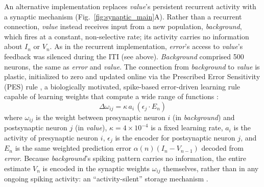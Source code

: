 \begin{ms}

An alternative implementation replaces \textit{value}'s persistent recurrent activity with a synaptic mechanism (Fig.~\ref{fig:synaptic_main}A). Rather than a recurrent connection, \textit{value} instead receives input from a new population, \textit{background}, which fires at a constant, non-selective rate; its activity carries no information about $I_n$ or $V_n$. As in the recurrent implementation, \textit{error}'s access to \textit{value}'s feedback was silenced during the ITI (see above). \textit{Background} comprised 500 neurons, the same as \textit{error} and \textit{value}. The connection from \textit{background} to \textit{value} is plastic, initialized to zero and updated online via the Prescribed Error Sensitivity (PES) rule \citep{macneil2011fine}, a biologically motivated, spike-based error-driven learning rule capable of learning weights that compute a wide range of functions \citep{voelker2015solution}:
\[
	\Delta\omega_{ij} = \kappa\, a_i\, (\epsilon_j \cdot E_n)
\]
where $\omega_{ij}$ is the weight between presynaptic neuron $i$ (in \textit{background}) and postsynaptic neuron $j$ (in \textit{value}), $\kappa=4\times10^{-4}$ is a fixed learning rate, $a_i$ is the activity of presynaptic neuron $i$, $\epsilon_j$ is the encoder for postsynaptic neuron $j$, and $E_n$ is the same weighted prediction error $\alpha(n)(I_n-V_{n-1})$ decoded from \textit{error}. Because \textit{background}'s spiking pattern carries no information, the entire estimate $V_n$ is encoded in the synaptic weights $\omega_{ij}$ themselves, rather than in any ongoing spiking activity: an ``activity-silent'' storage mechanism \citep{mongillo2008synaptic, stokes2015activity}.
\end{ms}


